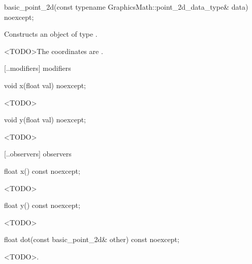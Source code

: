 %
\begin{itemdecl}
basic_point_2d(const typename GraphicsMath::point_2d_data_type& data) noexcept;
\end{itemdecl}
\begin{itemdescr}
\pnum
\effects
Constructs an object of type .

\pnum
<TODO>The coordinates are .
\end{itemdescr}

 [\iotwod.\pointtwod.modifiers]{ modifiers}

%
\begin{itemdecl}
void x(float val) noexcept;
\end{itemdecl}
\begin{itemdescr}
\pnum
\effects
<TODO>
\end{itemdescr}

%
\begin{itemdecl}
void y(float val) noexcept;
\end{itemdecl}
\begin{itemdescr}
\pnum
\effects
<TODO>
\end{itemdescr}

 [\iotwod.\pointtwod.observers]{ observers}

%
\begin{itemdecl}
float x() const noexcept;
\end{itemdecl}
\begin{itemdescr}
\pnum
\returns
<TODO>
\end{itemdescr}

%
\begin{itemdecl}
float y() const noexcept;
\end{itemdecl}
\begin{itemdescr}
\pnum
\returns
<TODO>
\end{itemdescr}

%
\begin{itemdecl}
float dot(const basic_point_2d& other) const noexcept;
\end{itemdecl}
\begin{itemdescr}
\pnum
\returns
<TODO>.
\end{itemdescr}

